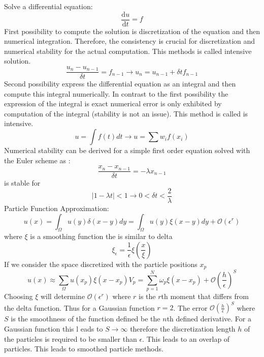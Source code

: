 \documentclass[hyperref]{labbook}
\numberwithin{equation}{experiment}
\numberwithin{table}{experiment}
\numberwithin{figure}{experiment}
\begin{document}
Solve a differential equation: \\
\begin{equation}
\frac{\mathrm{d}u}{\mathrm{d}t} = f
\end{equation}
First possibility to compute the solution is discretization of the equation and then numerical integration. Therefore, the consistency is crucial for discretization and numerical stability for the actual computation. This methods is called intensive solution. 
\begin{equation}
\frac{u_n - u_{n-1}}{\delta t} = f_{n-1} \rightarrow u_n = u_{n-1} + \delta t f_{n-1}
\end{equation}
Second possibility express the differential equation as an integral and then compute this integral numerically. In contrast to the first possibility the expression of the integral is exact numerical error is only exhibited by computation of the integral (stability is not an issue). This method is called is intensive. 
\begin{equation}
u = \int f(t ) dt \rightarrow u = \sum w_i f(x_i)
\end{equation}
Numerical stability can be derived for a simple first order equation solved with the Euler scheme as :
\begin{equation}
\frac{x_n - x_{n-1}}{\delta t} = -\lambda x_{n-1}
\end{equation}
is stable for 
\begin{equation}
|1- \lambda t| < 1 \rightarrow  0 <\delta t < \frac{2}{\lambda}
\end{equation}
Particle Function Approximation: \\
\begin{equation}
u(x) = \int_\Omega u(y) \delta(x-y) dy =   \int_\Omega u(y) \xi(x-y) dy + \mathcal{O}(\epsilon^r)
\end{equation}
where $\xi$ is a smoothing function the is similar to delta 
\begin{equation}
\xi_{\epsilon} = \frac{1}{\epsilon}\xi\left(\frac{x}{\xi}\right)
\end{equation}
If we consider the space discretized with the particle positions $x_p$
\begin{equation}
u(x)  \approx  \sum_\Omega u(x_p) \xi(x-x_p) V_p = \sum_{p  = 1}^N \omega_p \xi(x-x_p)+ \mathcal{O}\left( \frac{h}{\epsilon}\right)^S
\end{equation}
Choosing $\xi$ will determine  $\mathcal{O}(\epsilon^r)$ where $r$ is the $r$th  moment that differs from the delta function. Thus for a Gaussian function $r = 2$. The error  $\mathcal{O}\left( \frac{h}{\epsilon}\right)^S$ where $S$ is the smoothness of the function defined be the $n$th defined derivative. For a Gaussian function this l eads to $S \rightarrow \infty $ therefore the discretization length $h$ of the particles is required to be smaller than $\epsilon$. This leads to an overlap of particles. This leads to smoothed particle methods. \\[1em]
\end{document}

